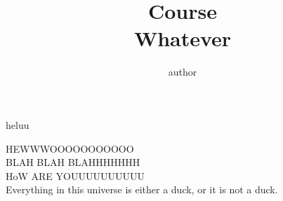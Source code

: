 \documentclass[addpoints]{exam}
\title{Course\\ Whatever}
\author{author}
\begin{document}
\maketitle

\begin{questions}
    \question
     heluu
    \begin{solution}
        HEWWWOOOOOOOOOOO \\ 
        BLAH BLAH BLAHHHHHHH \\ 
        HoW ARE YOUUUUUUUUUU \\
        Everything in this universe is either a duck, or it is not a duck. 
    \end{solution}
    
\end{questions}
\end{document}
